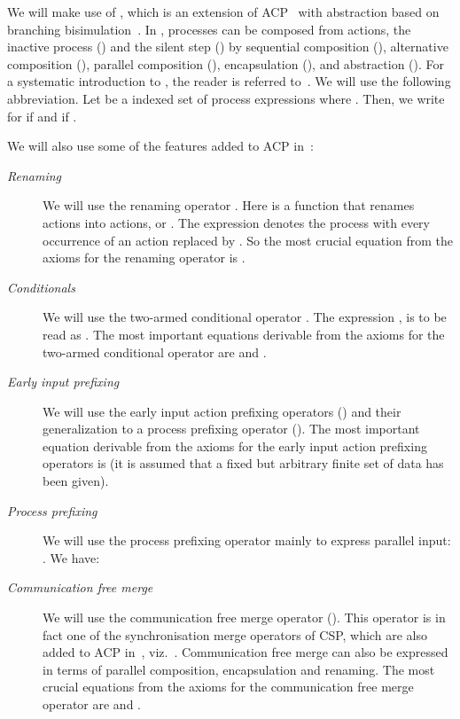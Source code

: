 \documentclass[fleqn]{llncs}
\begin{document}
We will make use of \acpt, which is an extension of ACP~\cite{BK84b} 
with abstraction based on branching bisimulation~\cite{GW96}.
In \acpt, processes can be composed from actions, the inactive process 
() and the silent step () by sequential composition 
(), alternative composition (), parallel composition 
(), encapsulation (), and abstraction ().
For a systematic introduction to \acpt, the reader is referred
to~\cite{BW90}.
We will use the following abbreviation.
Let  be a indexed set of process expressions
where .
Then, we write  for
 if  and 
if .

We will also use some of the features added to ACP in~\cite{BB94a}:
\begin{description}
\item[\it Renaming]
We will use the renaming operator .
Here  is a function that renames actions into actions,  or
.
The expression  denotes the process  with every occurrence
of an action  replaced by .
So the most crucial equation from the axioms for the renaming operator is 
.
\item[\it Conditionals]
We will use the two-armed conditional operator .
The expression , is to be read as
.
The most important equations derivable from the axioms for the two-armed 
conditional operator are  and 
.
\item[\it Early input prefixing]
We will use the early input action prefixing operators \sloppy
() and their generalization to a process prefixing 
operator ().
The most important equation derivable from the axioms for the early 
input action prefixing operators is 
 (it is assumed 
that a fixed but arbitrary finite set  of data has been given).
\item[\it Process prefixing]
We will use the process prefixing operator mainly to express parallel input:
.
We have:
\begin{center}
\footnotesize

\end{center}
\item[\it Communication free merge]
We will use the communication free merge operator (). 
This operator is in fact one of the synchronisation merge operators 
 of CSP, which are also added to ACP in~\cite{BB94a}, viz.\  
.
Communication free merge can also be expressed in terms of parallel
composition, encapsulation and renaming.
The most crucial equations from the axioms for the communication free 
merge operator are  and
.
\end{description}
\end{document}
